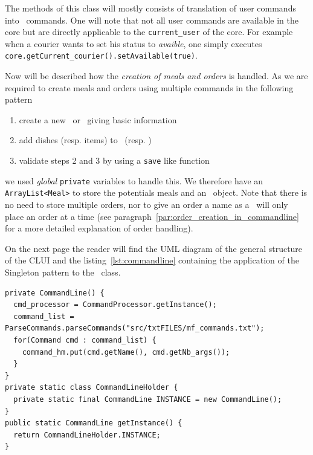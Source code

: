 The methods of this class will mostly consists of translation
of user commands into \Core~commands.
One will note that not all user commands are available in
the core but are directly applicable to the \lstinline|current_user|
of the core. For example when a courier wants to set his status
to \emph{avaible},
one simply executes \lstinline|core.getCurrent_courier().setAvailable(true)|.

Now will be described how the \emph{creation of meals and orders} is handled. 
As we are required to create meals and orders
using multiple commands in the following pattern
\begin{enumerate}
  \item create a new \Meal~or \Order~giving basic information
  \item add dishes (resp. items) to \Meal~(resp. \Order)
  \item validate steps 2 and 3 by using a \lstinline|save| like function
\end{enumerate}
we used \emph{global} \lstinline|private| variables to handle this.
We therefore have an \lstinline|ArrayList<Meal>|
to store the potentials meals and an \Order~object.
Note that there is no need to store multiple orders, nor to give an order
a name as a \Customer~will only place an order at a time
(see paragraph~\ref{par:order_creation_in_commandline} for a more detailed
explanation of order handling).

On the next page the reader will find the UML diagram of the
general structure of the CLUI and the listing~\ref{lst:commandline}
containing the application of the Singleton pattern to the
\CommandLine~class.
  
\begin{lstlisting}[caption=Singleton pattern with CommandLine class.,
   label=lst:commandline] 
private CommandLine() {
  cmd_processor = CommandProcessor.getInstance();
  command_list = ParseCommands.parseCommands("src/txtFILES/mf_commands.txt");
  for(Command cmd : command_list) {
    command_hm.put(cmd.getName(), cmd.getNb_args());
  }
}
private static class CommandLineHolder {
  private static final CommandLine INSTANCE = new CommandLine();
}
public static CommandLine getInstance() {
  return CommandLineHolder.INSTANCE;
}
\end{lstlisting}

\vspace{1cm}

